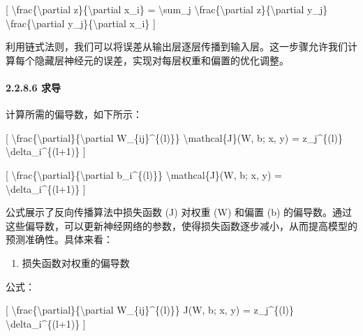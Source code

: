 {[} \textbackslash frac\{\textbackslash partial
z\}\{\textbackslash partial x\_i\} = \textbackslash sum\_j
\textbackslash frac\{\textbackslash partial z\}\{\textbackslash partial
y\_j\} \textbackslash frac\{\textbackslash partial
y\_j\}\{\textbackslash partial x\_i\} {]}


利用链式法则，我们可以将误差从输出层逐层传播到输入层。这一步骤允许我们计算每个隐藏层神经元的误差，实现对每层权重和偏置的优化调整。

\paragraph{\texorpdfstring{\textbf{2.2.8.6}
\textbf{求导}}{2.2.8.6 求导}}\label{2286-ux6c42ux5bfc}

计算所需的偏导数，如下所示：

{[}
\textbackslash frac\{\textbackslash partial\}\{\textbackslash partial
W\_\{ij\}\^{}\{(l)\}\} \textbackslash mathcal\{J\}(W, b; x, y) =
z\_j\^{}\{(l)\} \textbackslash delta\_i\^{}\{(l+1)\} {]}

{[}
\textbackslash frac\{\textbackslash partial\}\{\textbackslash partial
b\_i\^{}\{(l)\}\} \textbackslash mathcal\{J\}(W, b; x, y) =
\textbackslash delta\_i\^{}\{(l+1)\} {]}


公式展示了反向传播算法中损失函数 (J) 对权重 (W) 和偏置 (b)
的偏导数。通过这些偏导数，可以更新神经网络的参数，使得损失函数逐步减小，从而提高模型的预测准确性。具体来看：

\begin{enumerate}
\def\labelenumi{\arabic{enumi}.}
\item
  损失函数对权重的偏导数
\end{enumerate}

公式：

{[}
\textbackslash frac\{\textbackslash partial\}\{\textbackslash partial
W\_\{ij\}\^{}\{(l)\}\} J(W, b; x, y) = z\_j\^{}\{(l)\}
\textbackslash delta\_i\^{}\{(l+1)\} {]}


